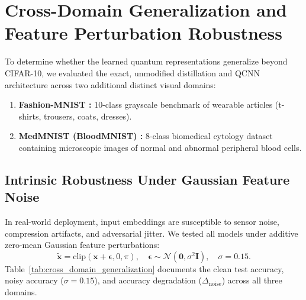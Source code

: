 \documentclass[10pt,twocolumn,twoside,a4paper]{article}
\begin{document}
\section{Cross-Domain Generalization and Feature Perturbation Robustness}
\label{sec:cross_domain}

To determine whether the learned quantum representations generalize beyond CIFAR-10, we evaluated the exact, unmodified distillation and QCNN architecture across two additional distinct visual domains:
\begin{enumerate}
    \item \textbf{Fashion-MNIST \cite{xiao2017fashion}:} 10-class grayscale benchmark of wearable articles (t-shirts, trousers, coats, dresses).
    \item \textbf{MedMNIST (BloodMNIST) \cite{medmnistv2}:} 8-class biomedical cytology dataset containing microscopic images of normal and abnormal peripheral blood cells.
\end{enumerate}

\subsection{Intrinsic Robustness Under Gaussian Feature Noise}
In real-world deployment, input embeddings are susceptible to sensor noise, compression artifacts, and adversarial jitter. We tested all models under additive zero-mean Gaussian feature perturbations:
\begin{equation}
    \tilde{\mathbf{x}} = \text{clip}\left( \mathbf{x} + \boldsymbol{\epsilon}, 0, \pi \right), \quad \boldsymbol{\epsilon} \sim \mathcal{N}(\mathbf{0}, \sigma^2 \mathbf{I}), \quad \sigma = 0.15.
\end{equation}
Table~\ref{tab:cross_domain_generalization} documents the clean test accuracy, noisy accuracy ($\sigma=0.15$), and accuracy degradation ($\Delta_{\text{noise}}$) across all three domains.
\end{document}
